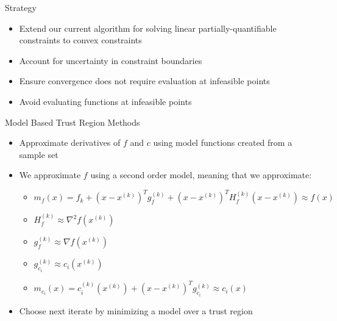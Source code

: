 \documentclass{beamer}
\newcommand{\xk}{{{x}^{(k)}}}
\newcommand{\mk}{{m_f}}
\newcommand{\fk}{{f_k}}
\newcommand{\fgk}{{g^{(k)}_f}}
\newcommand{\fhk}{{H^{(k)}_f}}
\newcommand{\ck}{{c^{(k)}_{i}(\xk)}}
\newcommand{\cgk}{{g^{(k)}_{c_i}}}
\newcommand{\mck}{{m_{c_i}}}
\begin{document}
\begin{frame}{Strategy}
    \begin{itemize}
        \item Extend our current algorithm for solving linear partially-quantifiable constraints to convex constraints
        \item Account for uncertainty in constraint boundaries
        \item Ensure convergence does not require evaluation at infeasible points
        \item Avoid evaluating functions at infeasible points
    \end{itemize}
\end{frame}





\begin{frame}{Model Based Trust Region Methods}
    \begin{itemize}
        \setlength\itemsep{2em}
    	\item Approximate derivatives of $f$ and $c$ using model functions created from a sample set
    	\item We approximate $f$ using a second order model, meaning that we approximate:
    	\begin{itemize}
            \item $\mk(x) = \fk + \left(x - \xk \right)^T\fgk + \left(x - \xk \right)^T\fhk\left(x - \xk \right) \approx f(x)$
            \item $\fhk \approx \nabla ^2 f(\xk)$
            \item $\fgk \approx \nabla f(\xk)$
            \item $\cgk \approx c_i(\xk)$
            \item $\mck(x) = \ck + \left(x - \xk\right)^T\cgk \approx c_i(x)$
    	\end{itemize}
	    \item Choose next iterate by minimizing a model over a trust region
	\end{itemize}
\end{frame}
\end{document}
